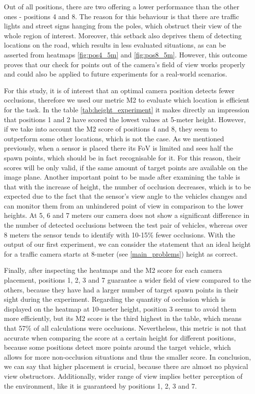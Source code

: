 Out of all positions, there are two offering a lower performance than the other ones - positions 4 and 8. The reason for this behaviour is that there are traffic lights and street signs hanging from the poles, which obstruct their view of the whole region of interest. Moreover, this setback also deprives them of detecting locations on the road, which results in less evaluated situations, as can be asserted from heatmaps \ref{fig:pos4_5m} and \ref{fig:pos8_5m}. However, this outcome proves that our check for points out of the camera's field of view works properly and could also be applied to future experiments for a real-world scenarios.

For this study, it is of interest that an optimal camera position detects fewer occlusions, therefore we used our metric M2 to evaluate which location is efficient for the task. In the table \ref{tab:height_experiment} it makes directly an impression that positions 1 and 2 have scored the lowest values at 5-meter height. However, if we take into account the M2 score of positions 4 and 8, they seem to outperform some other locations, which is not the case. As we mentioned previously, when a sensor is placed there its FoV is limited and sees half the spawn points, which should be in fact recognisable for it. For this reason, their scores will be only valid, if the same amount of target points are available on the image plane. Another important point to be made after examining the table is that with the increase of height, the number of occlusion decreases, which is to be expected due to the fact that the sensor's view angle to the vehicles changes and can monitor them from an unhindered point of view in comparison to the lower heights. At 5, 6 and 7 meters our camera does not show a significant difference in the number of detected occlusions between the test pair of vehicles, whereas over 8 meters the sensor tends to identify with 10-15\% fewer occlusions. With the output of our first experiment, we can consider the statement that an ideal height for a traffic camera starts at 8-meter (see \ref{main_problems}) height as correct.

Finally, after inspecting the heatmaps and the M2 score for each camera placement, positions 1, 2, 3 and 7 guarantee a wider field of view compared to the others, because they have had a larger number of target spawn points in their sight during the experiment. Regarding the quantity of occlusion which is displayed on the heatmap at 10-meter height, position 3 seems to avoid them more efficiently, but its M2 score is the third highest in the table, which means that 57\% of all calculations were occlusions. Nevertheless, this metric is not that accurate when comparing the score at a certain height for different positions, because some positions detect more points around the target vehicle, which allows for more non-occlusion situations and thus the smaller score. In conclusion, we can say that higher placement is crucial, because there are almost no physical view obstructors. Additionally, wider range of view implies better perception of the environment, like it is guaranteed by positions 1, 2, 3 and 7.


